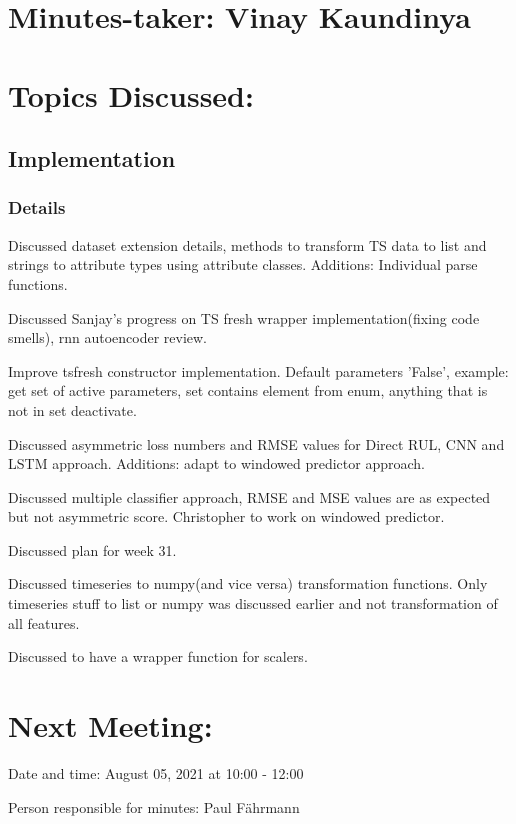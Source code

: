 \documentclass[11pt]{meetingmins} %
\begin{document}
\maketitle

\section{Minutes-taker: Vinay Kaundinya}

\section{Topics Discussed:}

\subsection{Implementation}
\subsubsection{Details}
\begin{hiddensubitems}
    \item Discussed dataset extension details, methods to transform TS data to list and strings to attribute types using attribute classes. Additions: Individual parse functions.
    \item Discussed Sanjay's progress on TS fresh wrapper implementation(fixing code smells), rnn autoencoder review.
    \item Improve tsfresh constructor implementation. Default parameters 'False', example: get set of active parameters, set contains element from enum, anything that is not in set deactivate.
    \item Discussed asymmetric loss numbers and RMSE values for Direct RUL, CNN and LSTM approach. Additions: adapt to windowed predictor approach.
    \item Discussed multiple classifier approach, RMSE and MSE values are as expected but not asymmetric score. Christopher to work on windowed predictor.
    \item Discussed plan for week 31.
    \item Discussed timeseries to numpy(and vice versa) transformation functions. Only timeseries stuff to list or numpy was discussed earlier and not transformation of all features.
    \item Discussed to have a wrapper function for scalers.
\end{hiddensubitems}

\section{Next Meeting:}
\begin{hiddensubitems}
    \item Date and time: August 05, 2021 at 10:00 - 12:00
    \item Person responsible for minutes: Paul Fährmann
\end{hiddensubitems}
\end{document}
